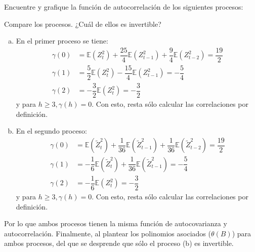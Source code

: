 

\addpoints
\question[15] Encuentre y grafique la función de autocorrelación de los siguientes procesos:
\noaddpoints
{}
Compare los procesos. ¿Cuál de ellos es invertible?
\begin{solution}
\begin{enumerate}[a)]
\item En el primer proceso se tiene:
\begin{align*}
\gamma(0)&=\mathbb{E}(Z_{t}^{2})+\dfrac{25}{4}\mathbb{E}(Z_{t-1}^{2})+\dfrac{9}{4}\mathbb{E}(Z_{t-2}^{2})=\dfrac{19}{2}\\
\gamma(1)&=\dfrac{5}{2}\mathbb{E}(Z_{t}^{2})-\dfrac{15}{4}\mathbb{E}(Z_{t-1}^{2})=-\dfrac{5}{4}\\
\gamma(2)&=-\dfrac{3}{2}\mathbb{E}(Z_{t}^{2})=-\dfrac{3}{2}
\end{align*}
y para $h\geq 3, \gamma(h)=0$. Con esto, resta sólo calcular las correlaciones por definición.
\item En el segundo proceso:
\begin{align*}
\gamma(0)&=\mathbb{E}(\tilde{Z}_{t}^{2})+\dfrac{1}{36}\mathbb{E}(\tilde{Z}_{t-1}^{2})+\dfrac{1}{36}\mathbb{E}(\tilde{Z}_{t-2}^{2})=\dfrac{19}{2}\\
\gamma(1)&=-\dfrac{1}{6}\mathbb{E}(\tilde{Z}_{t}^{2})+\dfrac{1}{36}\mathbb{E}(\tilde{Z}_{t-1}^{2})=-\dfrac{5}{4}\\
\gamma(2)&=-\dfrac{1}{6}\mathbb{E}(Z_{t}^{2})=-\dfrac{3}{2}
\end{align*}
y para $h\geq 3, \gamma(h)=0$. Con esto, resta sólo calcular las correlaciones por definición.
\end{enumerate}
Por lo que ambos procesos tienen la misma función de autocovarianza y autocorrelación. Finalmente, al plantear los polinomios asociados ($\theta(B)$) para ambos procesos, del que se desprende que sólo el proceso (b) es invertible.
\end{solution}